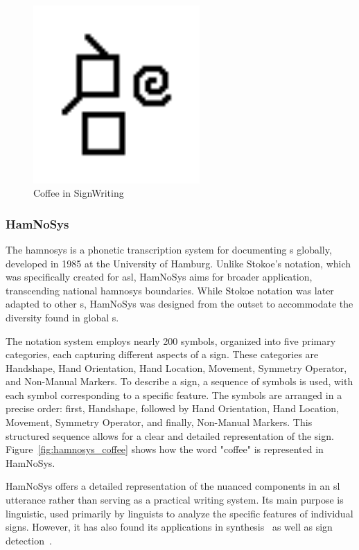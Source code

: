\documentclass[../../main.tex]{subfiles}
\begin{document}
\begin{figure}
  \centering \includegraphics[width = 2.5in]{chapters/background_work/images/signwriting_coffee.png}
  \caption{Coffee in SignWriting}
  \label{fig:signwriting_coffee}
\end{figure}

\subsubsection{HamNoSys}
\label{ch:background_work:sign_language_descriptions:lexical_approaches:hamnosys}

The \gls{hamnosys} is a phonetic transcription system for documenting s globally, developed in 1985 at the University of Hamburg. Unlike Stokoe's notation, which was specifically created for \gls{asl}, HamNoSys aims for broader application, transcending national \gls{hamnosys} boundaries. While Stokoe notation was later adapted to other s, HamNoSys was designed from the outset to accommodate the diversity found in global s.

The notation system employs nearly 200 symbols, organized into five primary categories, each capturing different aspects of a sign. These categories are Handshape, Hand Orientation, Hand Location, Movement, Symmetry Operator, and Non-Manual Markers. To describe a sign, a sequence of symbols is used, with each symbol corresponding to a specific feature. The symbols are arranged in a precise order: first, Handshape, followed by Hand Orientation, Hand Location, Movement, Symmetry Operator, and finally, Non-Manual Markers. This structured sequence allows for a clear and detailed representation of the sign. Figure~\ref{fig:hamnosys_coffee} shows how the word "coffee" is represented in HamNoSys.

HamNoSys offers a detailed representation of the nuanced components in an \gls{sl} \gls{utterance} rather than serving as a practical writing system. Its main purpose is linguistic, used primarily by linguists to analyze the specific features of individual signs. However, it has also found its applications in synthesis~\cite{elliott2010towards} as well as sign detection~\cite{mocialov2022unsupervised}.
\end{document}
